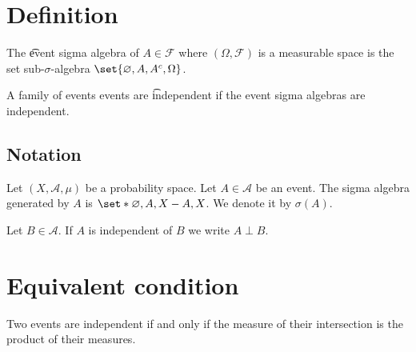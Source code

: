 

\section*{Definition}

The \t{event sigma algebra} of $A \in \mathcal{F} $ where $(\Omega , \mathcal{F} )$ is a measurable space is the set sub-$\sigma $-algebra $\set{\varnothing, A, A^c, \Omega }$.

A family of events events are \t{independent} if the event sigma algebras are independent.

\subsection*{Notation}

Let $(X, \mathcal{A} , \mu )$ be a probability space.
Let $A \in \mathcal{A} $ be an event.
The sigma algebra generated by $A$ is $\set*{\varnothing, A, X - A, X}$.
We denote it by $\sigma (A)$.

Let $B \in \mathcal{A} $.
If $A$ is independent of $B$ we write $A \perp  B$.

\section*{Equivalent condition}

\begin{proposition}
Two events are independent if and only if the measure of their intersection is the product of their measures.
\end{proposition}

